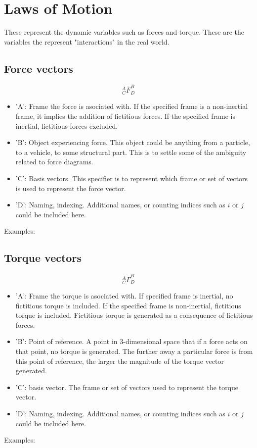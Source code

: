 \section{Laws of Motion}
\begin{comment}
\end{comment}
These represent the dynamic variables such as forces and torque.
These are the variables the represent "interactions" in the real world.
\subsection{Force vectors}
\begin{comment}
\end{comment}
$${}^{A}_{C}\bar{F}^{B}_{D}$$
\begin{itemize}
    \item 'A': Frame the force is asociated with. If the specified frame is a non-inertial frame, it implies the addition of fictitious forces. If the specified frame is inertial, fictitious forces excluded.
    \item 'B': Object experiencing force. This object could be anything from a particle, to a vehicle, to some structural part. This is to settle some of the ambiguity related to force diagrams.
    \item 'C': Basis vectors. This specifier is to represent which frame or set of vectors is used to represent the force vector.
    \item 'D': Naming, indexing. Additional names, or counting indices such as $i$ or $j$ could be included here.
\end{itemize}
Examples:
\subsection{Torque vectors}
\begin{comment}
\end{comment}
$${}^{A}_{C}\bar{\Gamma}^{B}_{D}$$
\begin{itemize}
    \item 'A': Frame the torque is asociated with. If specified frame is inertial, no fictitious torque is included. If the specified frame is non-inertial, fictitious torque is included. Fictitious torque is generated as a consequence of fictitious forces.
    \item 'B': Point of reference. A point in $3$-dimensional space that if a force acts on that point, no torque is generated. The further away a particular force is from this point of reference, the larger the magnitude of the torque vector generated.
    \item 'C': basis vector. The frame or set of vectors used to represent the torque vector.
    \item 'D': Naming, indexing. Additional names, or counting indices such as $i$ or $j$ could be included here.
\end{itemize}
Examples:
